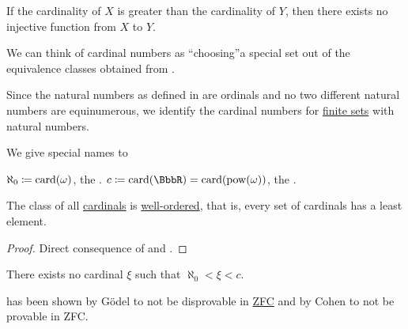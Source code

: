 \begin{corollary}\label{def:pigeonhole_principle}
  If the cardinality of \( X \) is greater than the cardinality of \( Y \), then there exists no injective function from \( X \) to \( Y \).
\end{corollary}

\begin{remark}\label{rem:cardinals}
  We can think of cardinal numbers as \enquote{choosing}\AOC a special set out of the equivalence classes obtained from .

  Since the natural numbers as defined in  are ordinals and no two different natural numbers are equinumerous, we identify the cardinal numbers for \hyperref[def:finite_set]{finite sets} with natural numbers.

  We give special names to
  \begin{thmenum}
     \( \aleph_0 \coloneqq \operatorname{card}(\omega) \), the .
     \( c \coloneqq \card(\BbbR) = \card(\pow(\omega)) \), the .
  \end{thmenum}
\end{remark}

\begin{proposition}\label{thm:cardinals_well_ordered}
  The class of all \hyperref[def:cardinal]{cardinals} is \hyperref[def:well_ordered_set]{well-ordered}, that is, every set of cardinals has a least element.
\end{proposition}
\begin{proof}
  Direct consequence of  and .
\end{proof}

\begin{conjecture}\label{hyp:continuum_hypothesis}\mcite\cite[165]{Enderton1977Sets}
  There exists no cardinal \( \xi \) such that \( \aleph_0 < \xi < c \).
\end{conjecture}

\medskip

\begin{remark}\label{rem:continuum_hypothesis}\mcite\cite[165]{Enderton1977Sets}
   has been shown by G\"odel to not be disprovable in \hyperref[def:set_zfc]{ZFC} and by Cohen to not be provable in ZFC.
\end{remark}

